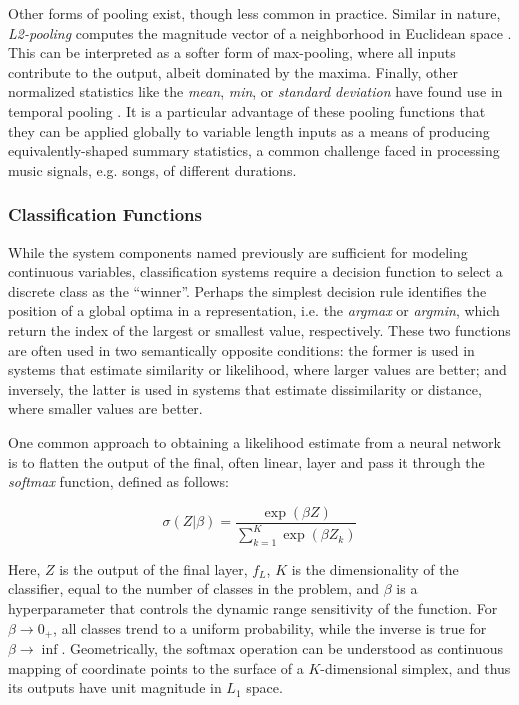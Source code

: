 Other forms of pooling exist, though less common in practice.
Similar in nature, \emph{L2-pooling} computes the magnitude vector of a neighborhood in Euclidean space \cite{Sermanet2012Convolutional}.
This can be interpreted as a softer form of max-pooling, where all inputs contribute to the output, albeit dominated by the maxima.
Finally, other normalized statistics like the \emph{mean}, \emph{min}, or \emph{standard deviation} have found use in temporal pooling \cite{Hamel2011Temporal}.
It is a particular advantage of these pooling functions that they can be applied globally to variable length inputs as a means of producing equivalently-shaped summary statistics, a common challenge faced in processing music signals, e.g. songs, of different durations.


\subsubsection{Classification Functions}

While the system components named previously are sufficient for modeling continuous variables, classification systems require a decision function to select a discrete class as the ``winner''.
Perhaps the simplest decision rule identifies the position of a global optima in a representation, i.e. the \emph{argmax} or \emph{argmin}, which return the index of the largest or smallest value, respectively.
These two functions are often used in two semantically opposite conditions:
the former is used in systems that estimate similarity or likelihood, where larger values are better;
and inversely, the latter is used in systems that estimate dissimilarity or distance, where smaller values are better.

One common approach to obtaining a likelihood estimate from a neural network is to flatten the output of the final, often linear, layer and pass it through the \emph{softmax} function, defined as follows:

\begin{equation}
\label{eq:softmax}
\sigma(Z | \beta) = \frac{\exp(\beta Z)}{ \sum_{k=1}^{K}\exp{(\beta Z_k)}}
\end{equation}

\noindent Here, $Z$ is the output of the final layer, $f_L$, $K$ is the dimensionality of the classifier, equal to the number of classes in the problem, and $\beta$ is a hyperparameter that controls the dynamic range sensitivity of the function.
For $\beta \to 0_+$, all classes trend to a uniform probability, while the inverse is true for $\beta \to \inf$.
Geometrically, the softmax operation can be understood as continuous mapping of coordinate points to the surface of a $K$-dimensional simplex, and thus its outputs have unit magnitude in $L_1$ space.

